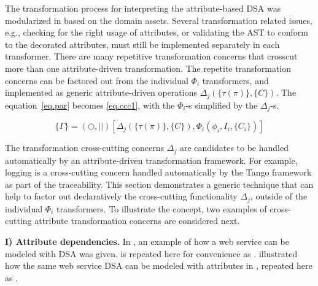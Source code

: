 The transformation process for interpreting the attribute-based DSA was modularized in  based on the domain assets. Several transformation related issues, e.g., checking for the right usage of attributes, or validating the AST to conform to the decorated attributes, must still be implemented separately in each transformer. There are many repetitive transformation concerns that crosscut more than one attribute-driven transformation. The repetite transformation concerns can be factored out from the individual $\Phi_i$ transformers, and implemented as generic attribute-driven operations $\Delta_j(\{\tau(\pi)\}, \{C\})$.  The equation~\ref{eq.par} becomes \ref{eq.ccc1}, with the $\Phi_i$-s simplified by the $\Delta_j$-s. 

\begin{equation}
\{\Gamma\} = (\bigcirc, ||)[\Delta_j(\{\tau(\pi)\}, \{C\}), \Phi_i(\phi_i, I_i, \{C_i\})]
\label{eq.ccc1}
\end{equation}

\noindent The transformation cross-cutting concerns $\Delta_j$ are candidates to be handled automatically by an attribute-driven transformation framework. For example, logging  is a cross-cutting concern handled automatically by the Tango framework as part of the traceability. This section demonstrates a generic technique that can help to factor out declaratively the cross-cutting functionality $\Delta_j$, outside of the individual $\Phi_i$ transformers. To illustrate the concept, two examples of cross-cutting attribute transformation concerns are considered next.

\textbf{ I) Attribute dependencies.} In , an example of how a web service can be modeled with DSA was given.  is repeated here for convenience as .  illustrated how the same web service DSA can be modeled with attributes in , repeated here as .

